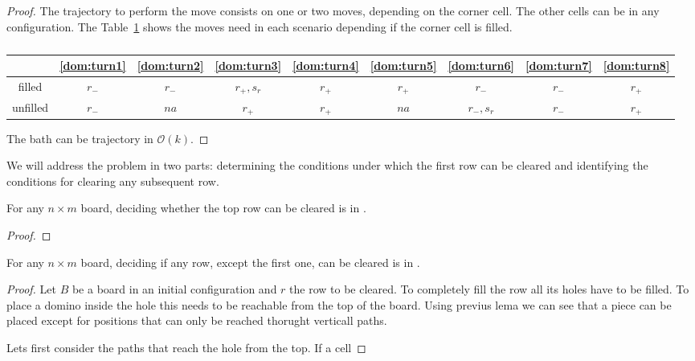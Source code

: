 \begin{proof}
  The trajectory to perform the move consists on one or two moves, depending on the corner cell. The other cells can be in any configuration. The Table~\ref{dom:turns-table} shows the moves need in each scenario depending if the corner cell is filled.


\begin{table}[ht]
\centering
\begin{tabular}{|c || c | c | c | c | c | c | c | c |} 
 \hline
  & \ref{dom:turn1} & \ref{dom:turn2} & \ref{dom:turn3} & \ref{dom:turn4} & \ref{dom:turn5} & \ref{dom:turn6} & \ref{dom:turn7} & \ref{dom:turn8} \\
 \hline               
  filled & $ r_-  $ & $      r_-    $ & $   r_+, s_r  $ & $   r_+       $ & $   r_+       $ & $     r_-     $ & $   r_-       $ & $   r_+      $  \\
 \hline               
unfilled & $ r_-  $ & $    na       $ & $   r_+       $ & $   r_+       $ & $    na       $ & $  r_-, s_r   $ & $   r_-       $ & $   r_+      $  \\
 \hline               

\end{tabular}
\caption{}
\label{dom:turns-table}
\end{table}

The bath can be trajectory in $\mathcal{O}(k)$.

\end{proof}



We will address the problem in two parts: determining the conditions under which the first row can be cleared and identifying the conditions for clearing any subsequent row.


\begin{lemma0}
For any $n \times m$ board, deciding whether the top row can be cleared is in \pp.
\end{lemma0}
\begin{proof}
\end{proof}

\begin{lemma0}
For any $n \times m$ board, deciding if any row, except the first one, can be cleared is in \pp.
\end{lemma0}

\begin{proof}
  Let $B$ be a board in an initial configuration and $r$ the row to be cleared. To completely fill the row all its holes have to be filled. To place a domino inside the hole this needs to be reachable from the top of the board. Using previus lema we can see that a piece can be placed except for positions that can only be reached thorught verticall paths.

  Lets first consider the paths that reach the hole from the top. If a cell

\end{proof}
